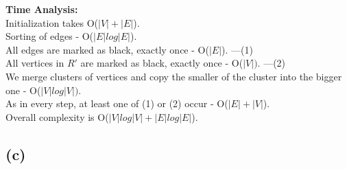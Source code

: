 \documentclass[11pt, fleqn]{article}
\begin{document}
\textbf{Time Analysis:} \\
Initialization takes O($|V|+|E|$).\\
Sorting of edges - O($|E|log|E|$).\\
All edges are marked as black, exactly once - O($|E|$). ---(1)\\
All vertices in $R'$ are marked as black, exactly once - O($|V|)$. ---(2)\\
We merge clusters of vertices and copy the smaller of the cluster into the bigger one - O($|V|log|V|)$.\\ 
As in every step, at least one of (1) or (2) occur - O($|E| + |V|$).\\
Overall complexity is O($|V|log|V| + |E|log|E|$).
\subsection*{(c)}
\end{document}
